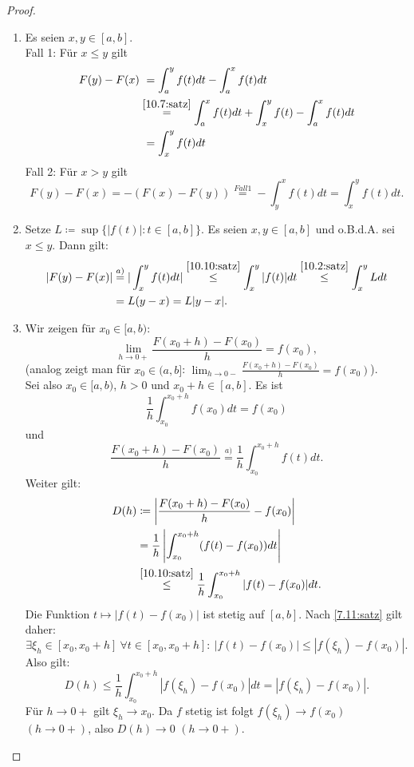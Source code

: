 \documentclass[12pt]{extreport} %
\theoremstyle{named}
\theoremstyle{itshape}
\theoremstyle{normal}
\begin{document}
{\begin{proof} ~\
	\begin{enumerate}
		\item Es seien $x, y \in [a, b]$. \\
		Fall 1: Für $x \leq y$ gilt
			\begin{align*}
				F(y) - F(x) & ~ = \int_{a}^{y} f(t) dt - \int_{a}^{x} f(t) dt \\
				& \overset{\ref{10.7:satz}}{=} \int_{a}^{x} f(t) dt + \int_{x}^{y} f(t) - \int_{a}^{x} f(t) dt \\
				& ~ = \int_{x}^{y} f(t) dt
			\end{align*}
			Fall 2: Für $x > y$ gilt
			$$ F(y) - F(x) = - (F(x) - F(y)) \overset{Fall 1}{=} - \int_{y}^{x} f(t) dt = \int_{x}^{y} f(t) dt. $$
		\item Setze $L \coloneqq \sup \{ |f(t)| : t \in [a, b] \}$. Es seien $x, y \in [a, b]$ und o.B.d.A. sei $x \leq y$. Dann gilt:
			\begin{align*}
				|F(y) - F(x)| & \overset{a)}{=} | \int_{x}^{y} f(t) dt | \overset{\ref{10.10:satz}}{\leq} \int_{x}^{y} |f(t)| dt 
				\overset{\ref{10.2:satz}}{\leq} \int_{x}^{y} L dt \\
				& = L (y - x) = L |y - x|.
			\end{align*}
		\item Wir zeigen für $x_{0} \in [a, b)$:
			$$ \lim_{h \rightarrow 0+} \frac{F(x_{0} + h) - F(x_{0})}{h} = f(x_{0}), $$
			(analog zeigt man für $x_{0} \in (a, b]$: $\lim_{h \rightarrow 0 - } \frac{F(x_{0} + h) - F(x_{0})}{h} = f(x_{0})$). \\
			Sei also $x_{0} \in [a, b)$, $h > 0$ und $x_{0} + h \in [a, b]$. Es ist
			$$ \frac{1}{h} \int_{x_{0}}^{x_{0}+h} f(x_{0}) dt = f(x_{0}) $$
			und
			$$ \frac{F(x_{0} + h) - F(x_{0})}{h} \overset{a)}{=} \frac{1}{h} \int_{x_{0}}^{x_{0}+h} f(t) dt. $$
			Weiter gilt: 
			\begin{align*} 
				D(h) & \coloneqq \left| \frac{F(x_{0} + h) - F(x_{0})}{h} - f(x_{0}) \right| \\
					 & = \frac{1}{h} \left| \int_{x_{0}}^{x_{0}+h} ( f(t) - f(x_{0}) ) dt \right| \\
					 & \overset{\ref{10.10:satz}}{\leq} \frac{1}{h} \int_{x_{0}}^{x_{0}+h} | f(t) - f(x_{0})| dt. 
			\end{align*} 
			Die Funktion $t \mapsto |f(t) - f(x_{0})|$ ist stetig auf $[a,b]$. Nach \ref{7.11:satz} gilt daher:
			$$\exists \xi_{h} \in [x_{0}, x_{0} + h] ~\forall t \in [x_{0}, x_{0} + h]: ~  |f(t) - f(x_{0})| \leq | f(\xi_{h}) - f(x_{0})|.$$
			Also gilt: 
			$$ D(h) \leq \frac{1}{h} \int_{x_{0}}^{x_{0}+ h} |f(\xi_{h}) - f(x_{0})| dt = |f(\xi_{h}) - f(x_{0})|. $$ 
			Für $h \rightarrow 0+$ gilt $\xi_{h} \rightarrow x_{0}$. Da $f$ stetig ist folgt $f(\xi_{h}) \rightarrow f(x_{0})$ $(h \to 0+)$, 
			also $D(h) \rightarrow 0$ $(h \rightarrow 0+)$. 
	\end{enumerate}
\end{proof}


}
\end{document}
